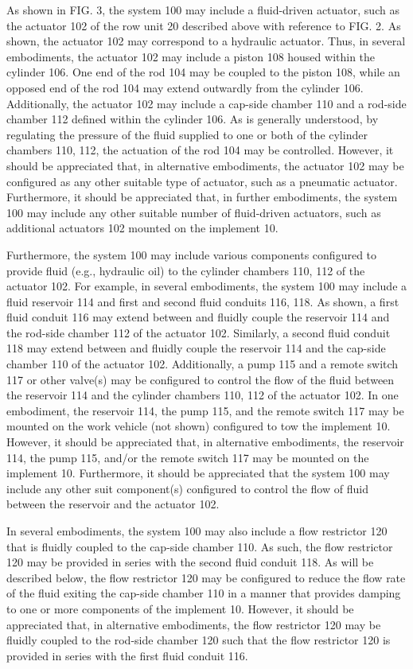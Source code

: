 \documentclass[11pt,a4paper]{article}
\begin{document}
As shown in FIG. 3, the system 100 may include a fluid-driven actuator, such as the actuator 102 of the row unit 20 described above with reference to FIG. 2. As shown, the actuator 102 may correspond to a hydraulic actuator. Thus, in several embodiments, the actuator 102 may include a piston 108 housed within the cylinder 106. One end of the rod 104 may be coupled to the piston 108, while an opposed end of the rod 104 may extend outwardly from the cylinder 106. Additionally, the actuator 102 may include a cap-side chamber 110 and a rod-side chamber 112 defined within the cylinder 106. As is generally understood, by regulating the pressure of the fluid supplied to one or both of the cylinder chambers 110, 112, the actuation of the rod 104 may be controlled. However, it should be appreciated that, in alternative embodiments, the actuator 102 may be configured as any other suitable type of actuator, such as a pneumatic actuator. Furthermore, it should be appreciated that, in further embodiments, the system 100 may include any other suitable number of fluid-driven actuators, such as additional actuators 102 mounted on the implement 10.

Furthermore, the system 100 may include various components configured to provide fluid (e.g., hydraulic oil) to the cylinder chambers 110, 112 of the actuator 102. For example, in several embodiments, the system 100 may include a fluid reservoir 114 and first and second fluid conduits 116, 118. As shown, a first fluid conduit 116 may extend between and fluidly couple the reservoir 114 and the rod-side chamber 112 of the actuator 102. Similarly, a second fluid conduit 118 may extend between and fluidly couple the reservoir 114 and the cap-side chamber 110 of the actuator 102. Additionally, a pump 115 and a remote switch 117 or other valve(s) may be configured to control the flow of the fluid between the reservoir 114 and the cylinder chambers 110, 112 of the actuator 102. In one embodiment, the reservoir 114, the pump 115, and the remote switch 117 may be mounted on the work vehicle (not shown) configured to tow the implement 10. However, it should be appreciated that, in alternative embodiments, the reservoir 114, the pump 115, and/or the remote switch 117 may be mounted on the implement 10. Furthermore, it should be appreciated that the system 100 may include any other suit component(s) configured to control the flow of fluid between the reservoir and the actuator 102.

In several embodiments, the system 100 may also include a flow restrictor 120 that is fluidly coupled to the cap-side chamber 110. As such, the flow restrictor 120 may be provided in series with the second fluid conduit 118. As will be described below, the flow restrictor 120 may be configured to reduce the flow rate of the fluid exiting the cap-side chamber 110 in a manner that provides damping to one or more components of the implement 10. However, it should be appreciated that, in alternative embodiments, the flow restrictor 120 may be fluidly coupled to the rod-side chamber 120 such that the flow restrictor 120 is provided in series with the first fluid conduit 116.
\end{document}
